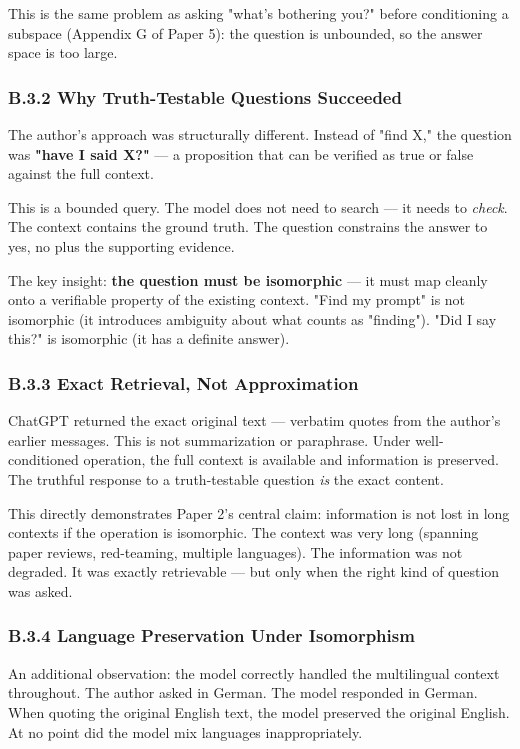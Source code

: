 This is the same problem as asking "what's bothering you?" before conditioning a subspace (Appendix G of Paper 5): the question is unbounded, so the answer space is too large.

\subsubsection*{B.3.2 Why Truth-Testable Questions Succeeded}

The author's approach was structurally different. Instead of "find X," the question was \textbf{"have I said X?"} --- a proposition that can be verified as true or false against the full context.

This is a bounded query. The model does not need to search --- it needs to \emph{check}. The context contains the ground truth. The question constrains the answer to {yes, no} plus the supporting evidence.

The key insight: \textbf{the question must be isomorphic} --- it must map cleanly onto a verifiable property of the existing context. "Find my prompt" is not isomorphic (it introduces ambiguity about what counts as "finding"). "Did I say this?" is isomorphic (it has a definite answer).

\subsubsection*{B.3.3 Exact Retrieval, Not Approximation}

ChatGPT returned the exact original text --- verbatim quotes from the author's earlier messages. This is not summarization or paraphrase. Under well-conditioned operation, the full context is available and information is preserved. The truthful response to a truth-testable question \emph{is} the exact content.

This directly demonstrates Paper 2's central claim: information is not lost in long contexts if the operation is isomorphic. The context was very long (spanning paper reviews, red-teaming, multiple languages). The information was not degraded. It was exactly retrievable --- but only when the right kind of question was asked.

\subsubsection*{B.3.4 Language Preservation Under Isomorphism}

An additional observation: the model correctly handled the multilingual context throughout. The author asked in German. The model responded in German. When quoting the original English text, the model preserved the original English. At no point did the model mix languages inappropriately.

